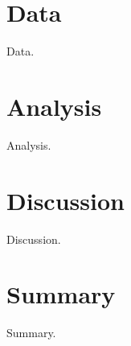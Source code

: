 \documentclass[twocolumn]{aastex62}
\begin{document}
\section{Data }\label{sec:data}

Data.


\section{Analysis}\label{sec:analysis}

Analysis.


\section{Discussion}\label{sec:discussion}

Discussion.


\section{Summary}\label{sec:summary}

Summary.

\end{document}
